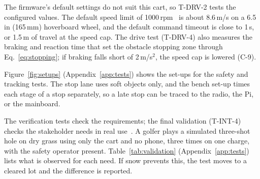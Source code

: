 The firmware's default settings do not suit this cart, so \mbox{T-DRV-2} tests the configured values. The default speed limit of 1000\,rpm~\cite{feruFoc} is about 8.6\,m/s on a 6.5\,in (165\,mm) hoverboard wheel, and the default command timeout is close to 1\,s, or 1.5\,m of travel at the speed cap. The drive test (\mbox{T-DRV-4}) also measures the braking and reaction time that set the obstacle stopping zone through Eq.~\eqref{eq:stopping}; if braking falls short of 2\,m/s$^2$, the speed cap is lowered (C-9).

\label{sec:vv-setups}

Figure~\ref{fig:setups} (Appendix~\ref{app:tests}) shows the set-ups for the safety and tracking tests. The stop lane uses soft objects only, and the bench set-up times each stage of a stop separately, so a late stop can be traced to the radio, the Pi, or the mainboard.

\label{sec:vv-validation}

The verification tests check the requirements; the final validation (\mbox{T-INT-4}) checks the stakeholder needs in real use~\cite[\S 5.4]{nasaHandbook}. A golfer plays a simulated three-shot hole on dry grass using only the cart and no phone, three times on one charge, with the safety operator present. Table~\ref{tab:validation} (Appendix~\ref{app:tests}) lists what is observed for each need. If snow prevents this, the test moves to a cleared lot and the difference is reported.
